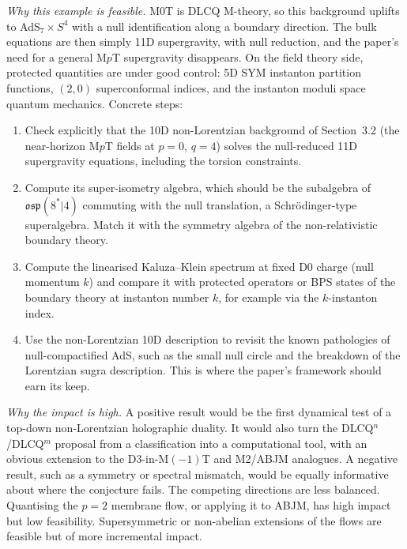 \documentclass[11pt,a4paper]{article}
\begin{document}
\emph{Why this example is feasible.}
M0T is DLCQ M-theory, so this background uplifts to AdS$_7\times S^4$ with a null
identification along a boundary direction. The bulk equations are then simply 11D
supergravity, with null reduction, and the paper's need for a general M$p$T
supergravity disappears. On the field theory side, protected quantities are under good
control: 5D SYM instanton partition functions, $(2,0)$ superconformal indices, and the
instanton moduli space quantum mechanics.
Concrete steps:
\begin{enumerate}[nosep]
\item Check explicitly that the 10D non-Lorentzian background
  of Section~3.2 (the near-horizon M$p$T fields at $p=0$, $q=4$) solves the null-reduced 11D supergravity equations,
  including the torsion constraints.
\item Compute its super-isometry algebra, which should be the subalgebra of
  $\mathfrak{osp}(8^*|4)$ commuting with the null translation, a Schr\"odinger-type
  superalgebra. Match it with the symmetry algebra of the non-relativistic boundary theory.
\item Compute the linearised Kaluza--Klein spectrum at fixed D0 charge (null
  momentum $k$) and compare it with protected operators or BPS states of the boundary
  theory at instanton number $k$, for example via the $k$-instanton index.
\item Use the non-Lorentzian 10D description to revisit the known pathologies of
  null-compactified AdS, such as the small null circle and the breakdown of the
  Lorentzian sugra description. This is where the paper's framework should earn its keep.
\end{enumerate}

\emph{Why the impact is high.} A positive result would be the first dynamical test of a
top-down non-Lorentzian holographic duality. It would also turn the DLCQ$^n$/DLCQ$^m$
proposal from a classification into a computational tool, with an obvious extension to
the D3-in-M$(-1)$T and M2/ABJM analogues. A negative result, such as a symmetry or
spectral mismatch, would be equally informative about where the conjecture fails. The
competing directions are less balanced. Quantising the $p=2$ membrane flow, or applying it to
ABJM, has high impact but low feasibility. Supersymmetric or non-abelian extensions of the
flows are feasible but of more incremental impact.
\end{document}
